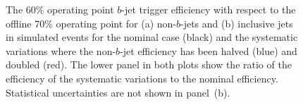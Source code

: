 \begin{figure}[!ht]
  \begin{center}
    \captionsetup[subfigure]{aboveskip=0pt,justification=centering}
  \end{center}
\vspace{-1em}
  \caption[The $b$-jet trigger efficiency for  non-$b$-jets and inclusive jets for systematic variations of the non-$b$-jet efficiency.]
          {The 60\% operating point $b$-jet trigger efficiency with respect to the offline 70\% operating point
            for (a) non-$b$-jets and (b) inclusive jets in simulated events
            for the  nominal case (black) and the systematic variations where the non-$b$-jet efficiency has been halved (blue) and doubled (red).
            The lower panel in both plots show the ratio of the efficiency of the systematic variations to the nominal efficiency.
            Statistical uncertainties are not shown in panel~(b).
  }
  \label{fig:Eff_LTrigEff}
\end{figure}


